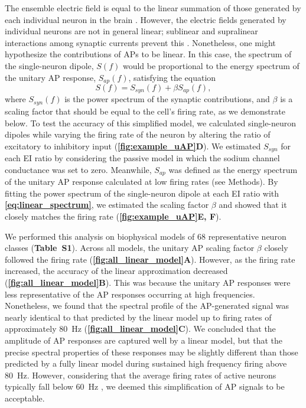 The ensemble electric field is equal to the linear summation of those generated by each individual neuron in the brain \cite{Nunez2006, Malmivuo1995}. However, the electric fields generated by individual neurons are not in general linear; sublinear and supralinear interactions among synaptic currents prevent this \cite{Tran-Van-Minh2015}. Nonetheless, one might hypothesize the contributions of APs to be linear. In this case, the spectrum of the single-neuron dipole, $S(f)$ would be proportional to the energy spectrum of the unitary AP response, $S_{ap}(f)$, satisfying the equation
\begin{equation} \label{eq:linear_spectrum}
S(f) = S_{syn}(f) + \beta S_{ap}(f),
\end{equation}
where $S_{syn}(f)$ is the power spectrum of the synaptic contributions, and $\beta$ is a scaling factor that should be equal to the cell's firing rate, as we demonstrate below. To test the accuracy of this simplified model, we calculated single-neuron dipoles while varying the firing rate of the neuron by altering the ratio of excitatory to inhibitory input (\textbf{\autoref{fig:example_uAP}D}). We estimated $S_{syn}$ for each EI ratio by considering the passive model in which the sodium channel conductance was set to zero. Meanwhile, $S_{ap}$ was defined as the energy spectrum of the unitary AP response calculated at low firing rates (see Methods). By fitting the power spectrum of the single-neuron dipole at each EI ratio with \textbf{\ref{eq:linear_spectrum}}, we estimated the scaling factor $\beta$ and showed that it closely matches the firing rate (\textbf{\autoref{fig:example_uAP}E, F}). 

We performed this analysis on biophysical models of 68 representative neuron classes \cite{Markram2015} (\textbf{Table~S1}). Across all models, the unitary AP scaling factor $\beta$ closely followed the firing rate (\textbf{\autoref{fig:all_linear_model}A}). However, as the firing rate increased, the accuracy of the linear approximation decreased (\textbf{\autoref{fig:all_linear_model}B}). This was because the unitary AP responses were less representative of the AP responses occurring at high frequencies. Nonetheless, we found that the spectral profile of the AP-generated signal was nearly identical to that predicted by the linear model up to firing rates of approximately 80~\unit{\hertz} (\textbf{\autoref{fig:all_linear_model}C}). We concluded that the amplitude of AP responses are captured well by a linear model, but that the precise spectral properties of these responses may be slightly different than those predicted by a fully linear model during sustained high frequency firing above 80~\unit{\hertz}. However, considering that the average firing rates of active neurons typically fall below \qty{60}{\hertz} \cite{Baddeley1997, Griffith1966, Shafi2007, OConnor2010}, we deemed this simplification of AP signals to be acceptable.

